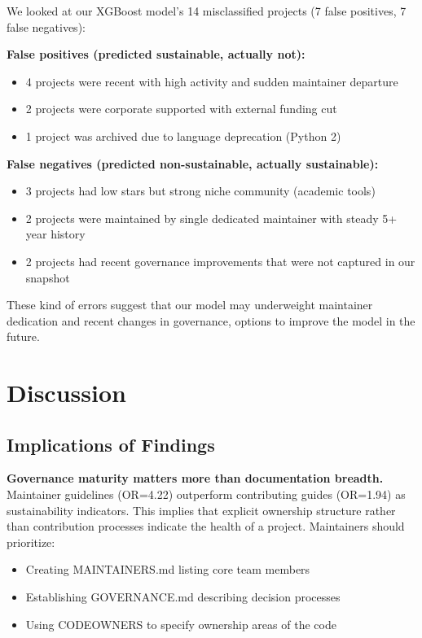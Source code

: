\documentclass[conference]{IEEEtran}
\begin{document}
We looked at our XGBoost model's 14 misclassified projects  (7 false positives, 7 false negatives):

\textbf{False positives (predicted sustainable, actually not):}
\begin{itemize}
    \item 4 projects were recent with high activity and sudden maintainer departure
    \item 2 projects were corporate supported with external funding cut
    \item 1 project was archived due to language deprecation (Python 2)
\end{itemize}

\textbf{False negatives (predicted non-sustainable, actually sustainable):}
\begin{itemize}
    \item 3 projects had low stars but strong niche community (academic tools)
    \item 2 projects were maintained by single dedicated maintainer with steady 5+ year history
    \item 2 projects had recent governance improvements that were not captured in our snapshot
\end{itemize}

These kind of errors suggest that our model may underweight maintainer dedication and recent changes in governance, options to improve the model in the future.

\section{Discussion}

\subsection{Implications of Findings}

\textbf{Governance maturity matters more than documentation breadth.} Maintainer guidelines (OR=4.22) outperform contributing guides (OR=1.94) as sustainability indicators. This implies that explicit ownership structure rather than contribution processes indicate the health of a project. Maintainers should prioritize:
\begin{itemize}
    \item Creating MAINTAINERS.md listing core team members
    \item Establishing GOVERNANCE.md describing decision processes
    \item Using CODEOWNERS to specify ownership areas of the code
\end{itemize}
\end{document}

